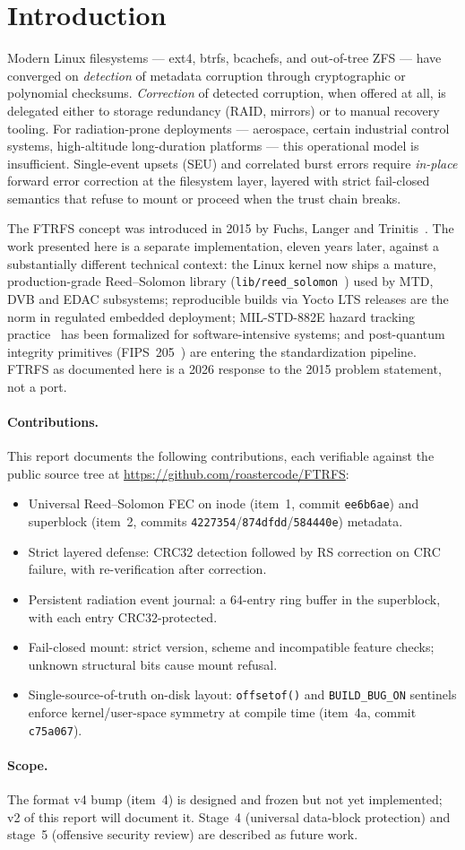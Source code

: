 \section{Introduction}\label{sec:intro}

Modern Linux filesystems --- ext4, btrfs, bcachefs, and out-of-tree
ZFS --- have converged on \emph{detection} of metadata corruption
through cryptographic or polynomial checksums. \emph{Correction}
of detected corruption, when offered at all, is delegated either to
storage redundancy (RAID, mirrors) or to manual recovery tooling.
For radiation-prone deployments --- aerospace, certain industrial
control systems, high-altitude long-duration platforms --- this
operational model is insufficient. Single-event upsets (SEU) and
correlated burst errors require \emph{in-place} forward error
correction at the filesystem layer, layered with strict
fail-closed semantics that refuse to mount or proceed when the
trust chain breaks.

The FTRFS concept was introduced in 2015 by Fuchs, Langer and
Trinitis~\cite{fuchs2015ftrfs}. The work presented here is a
separate implementation, eleven years later, against a substantially
different technical context: the Linux kernel now ships a mature,
production-grade Reed--Solomon library
(\texttt{lib/reed\_solomon}~\cite{kernelrslib}) used by MTD, DVB
and EDAC subsystems; reproducible builds via Yocto LTS releases
are the norm in regulated embedded deployment; MIL-STD-882E
hazard tracking practice~\cite{milstd882e} has been formalized
for software-intensive systems; and post-quantum integrity
primitives (FIPS~205~\cite{fips205}) are entering the
standardization pipeline. FTRFS as documented here is a 2026
response to the 2015 problem statement, not a port.

\paragraph{Contributions.} This report documents the following
contributions, each verifiable against the public source tree at
\url{https://github.com/roastercode/FTRFS}:
\begin{itemize}
\item Universal Reed--Solomon FEC on inode (item~1, commit
  \texttt{ee6b6ae}) and superblock (item~2, commits
  \texttt{4227354}/\texttt{874dfdd}/\texttt{584440e}) metadata.
\item Strict layered defense: CRC32 detection followed by RS
  correction on CRC failure, with re-verification after correction.
\item Persistent radiation event journal: a 64-entry ring buffer
  in the superblock, with each entry CRC32-protected.
\item Fail-closed mount: strict version, scheme and incompatible
  feature checks; unknown structural bits cause mount refusal.
\item Single-source-of-truth on-disk layout: \texttt{offsetof()}
  and \texttt{BUILD\_BUG\_ON} sentinels enforce kernel/user-space
  symmetry at compile time (item~4a, commit \texttt{c75a067}).
\end{itemize}

\paragraph{Scope.} The format v4 bump (item~4) is designed and
frozen but not yet implemented; v2 of this report will document it.
Stage~4 (universal data-block protection) and stage~5 (offensive
security review) are described as future work.

